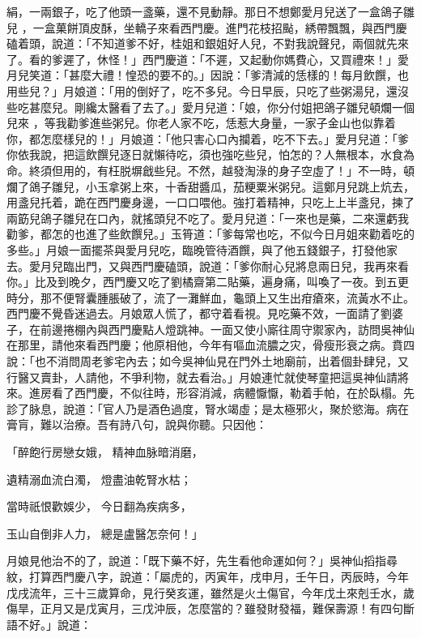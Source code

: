絹，一兩銀子，吃了他頭一盞藥，還不見動靜。那日不想鄭愛月兒送了一盒鴿子雛兒 ，一盒菓餅頂皮酥，坐轎子來看西門慶。進門花枝招颭，綉帶飄飄，與西門慶磕着頭，說道：「不知道爹不好，桂姐和銀姐好人兒，不對我說聲兒，兩個就先來了。看的爹遲了，休怪！」西門慶道：「不遲，又起動你媽費心，又買禮來！」愛月兒笑道：「甚麼大禮！惶恐的要不的。」因說：「爹清減的恁樣的！每月飲饌，也用些兒？」月娘道：「用的倒好了，吃不多兒。今日早辰，只吃了些粥湯兒，還沒些吃甚麼兒。剛纔太醫看了去了。」愛月兒道：「娘，你分付姐把鴿子雛兒頓爛一個兒來 ，等我勸爹進些粥兒。你老人家不吃，恁惹大身量，一家子金山也似靠着你，都怎麼樣兒的！」月娘道：「他只害心口內攔着，吃不下去。」愛月兒道：「爹你依我說，把這飲饌兒逐日就懶待吃，須也強吃些兒，怕怎的？人無根本，水食為命。終須但用的，有枉脱塀戧些兒。不然，越發淘淥的身子空虛了！」不一時，頓爛了鴿子雛兒，小玉拿粥上來，十香甜醬瓜，茄粳粟米粥兒。這鄭月兒跳上炕去，用盞兒托着，跪在西門慶身邊，一口口喂他。強打着精神，只吃上上半盞兒，揀了兩筯兒鴿子雛兒在口內，就搖頭兒不吃了。愛月兒道：「一來也是藥，二來還虧我勸爹，都怎的也進了些飲饌兒。」玉筲道：「爹每常也吃，不似今日月姐來勸着吃的多些。」月娘一面擺茶與愛月兒吃，臨晚管待酒饌，與了他五錢銀子，打發他家去。愛月兒臨出門，又與西門慶磕頭，說道：「爹你耐心兒將息兩日兒，我再來看你。」比及到晚夕，西門慶又吃了劉橘齋第二貼藥，遍身痛，叫喚了一夜。到五更時分，那不便腎囊腫脹破了，流了一灘鮮血，龜頭上又生出疳瘡來，流黃水不止。西門慶不覺昏迷過去。月娘眾人慌了，都守着看視。見吃藥不效，一面請了劉婆子，在前邊捲棚內與西門慶點人燈跳神。一面又使小廝往周守禦家內，訪問吳神仙在那里，請他來看西門慶；他原相他，今年有嘔血流膿之灾，骨瘦形衰之病。賁四說：「也不消問周老爹宅內去；如今吳神仙見在門外土地廟前，出着個卦肆兒，又行醫又賣卦，人請他，不爭利物，就去看治。」月娘連忙就使琴童把這吳神仙請將來。進房看了西門慶，不似往時，形容消減，病體懨懨，勒着手帕，在於臥榻。先診了脉息，說道：「官人乃是酒色過度，腎水竭虛；是太極邪火，聚於慾海。病在膏肓，難以治療。吾有詩八句，說與你聽。只因他：

「醉飽行房戀女娥，  精神血脉暗消磨，

遺精溺血流白濁，  燈盡油乾腎水枯；

當時祇恨歡娛少，  今日翻為疾病多，

玉山自倒非人力，  總是盧醫怎奈何！」

月娘見他治不的了，說道：「既下藥不好，先生看他命運如何？」吳神仙搯指尋紋，打算西門慶八字，說道：「屬虎的，丙寅年，戌申月，壬午日，丙辰時，今年戊戌流年，三十三歲算命，見行癸亥運，雖然是火土傷官，今年戊土來剋壬水，歲傷旱，正月又是戊寅月，三戊沖辰，怎麼當的？雖發財發福，難保壽源！有四句斷語不好。」說道：

